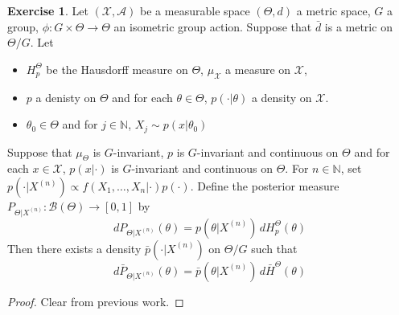 \documentclass[12pt]{amsart}
\theoremstyle{definition}
\newtheorem{ex}[definition]{Exercise}
\newcommand{\N}{\mathbb{N}}
\newcommand{\MA}{\mathcal{A}}
\newcommand{\MB}{\mathcal{B}}
\newcommand{\MX}{\mathcal{X}}
\begin{document}
	\begin{ex}
	Let $(\MX, \MA)$ be a measurable space $(\Theta, d)$ a metric space, $G$ a group, $\phi: G \times \Theta \rightarrow \Theta$ an isometric group action. Suppose that $\bar{d}$ is a metric on $\Theta / G$. Let 
	\begin{itemize}
	\item $H_p^{\Theta}$ be the Hausdorff measure on $\Theta$, $\mu_{\MX}$ a measure on $\MX$, 
	\item $p$ a denisty on $\Theta$ and for each $\theta \in \Theta$, $p(\cdot|\theta)$ a density on $\MX$. 
	\item $\theta_0 \in \Theta$ and for $j \in \N$, $X_j \sim p(x|\theta_0)$
	\end{itemize}
	Suppose that $\mu_{\Theta}$ is $G$-invariant, $p$ is $G$-invariant and continuous on $\Theta$ and for each $x \in \MX$, $p(x| \cdot)$ is $G$-invariant and continuous on $\Theta$. For $n \in \N$, set $p(\cdot|X^{(n)}) \propto f(X_1, \ldots, X_n| \cdot) p(\cdot)$. Define the posterior measure $P_{\Theta|X^{(n)}}: \MB(\Theta) \rightarrow [0, 1]$ by 
	\begin{equation*}
	d P_{\Theta|X^{(n)}} (\theta) = p(\theta |X^{(n)}) \, dH_p^{\Theta} (\theta)
	\end{equation*}
	Then there exists a density $\bar{p}(\cdot|X^{(n)})$ on $\Theta / G$ such that 
	\begin{equation*}
	d \bar{P}_{\Theta|X^{(n)}}(\theta) = \bar{p}(\theta |X^{(n)}) \, d\bar{H}^{\Theta} (\theta)
	\end{equation*}
	\end{ex}
	
	\begin{proof}
	Clear from previous work.
	\end{proof}
	
\end{document}
